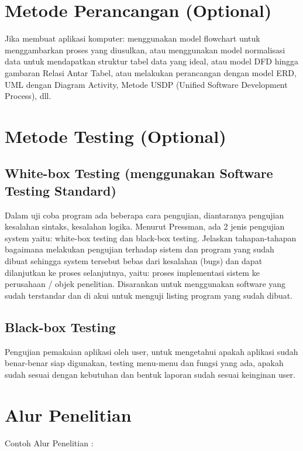 \documentclass[oneside,listof=totoc]{scrbook}
\begin{document}
\section{Metode Perancangan (Optional)}
Jika membuat aplikasi komputer: menggunakan model flowchart untuk menggambarkan proses yang diusulkan, atau menggunakan model normalisasi data untuk mendapatkan struktur tabel data yang ideal, atau model DFD hingga gambaran Relasi Antar Tabel, atau melakukan perancangan dengan model ERD, UML dengan Diagram Activity, Metode USDP (Unified Software Development Process), dll.

\section{Metode Testing (Optional)}

\subsection{White-box Testing (menggunakan Software Testing Standard)}
Dalam uji coba program ada beberapa cara pengujian, diantaranya pengujian kesalahan sintaks, kesalahan logika. Menurut Pressman, ada 2 jenis pengujian system yaitu: white-box testing dan black-box testing. Jelaskan tahapan-tahapan bagaimana melakukan pengujian terhadap sistem dan program yang sudah dibuat sehingga system tersebut bebas dari kesalahan (bugs) dan dapat dilanjutkan ke proses selanjutnya, yaitu: proses implementasi sistem ke perusahaan / objek penelitian. Disarankan untuk menggunakan software yang sudah terstandar dan di akui untuk menguji listing program yang sudah dibuat.

\subsection{Black-box Testing}
Pengujian pemakaian aplikasi oleh user, untuk mengetahui apakah aplikasi sudah benar-benar siap digunakan, testing menu-menu dan fungsi yang ada, apakah sudah sesuai dengan kebutuhan dan bentuk laporan sudah sesuai keinginan user.

\section{Alur Penelitian}
Contoh Alur Penelitian :


\backmatter
\pagestyle{plain}
\end{document}
